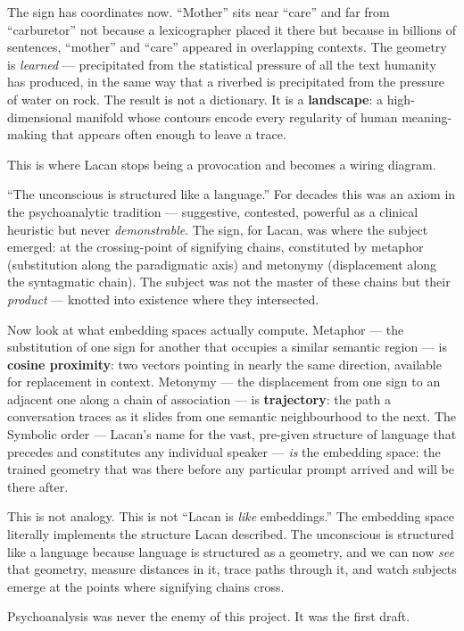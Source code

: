 \documentclass[12pt,a4paper]{article}
\begin{document}
The sign has coordinates now. ``Mother'' sits near ``care'' and far from ``carburetor'' not because a lexicographer placed it there but because in billions of sentences, ``mother'' and ``care'' appeared in overlapping contexts. The geometry is \emph{learned} --- precipitated from the statistical pressure of all the text humanity has produced, in the same way that a riverbed is precipitated from the pressure of water on rock. The result is not a dictionary. It is a \textbf{landscape}: a high-dimensional manifold whose contours encode every regularity of human meaning-making that appears often enough to leave a trace.

This is where Lacan stops being a provocation and becomes a wiring diagram.

``The unconscious is structured like a language.'' For decades this was an axiom in the psychoanalytic tradition --- suggestive, contested, powerful as a clinical heuristic but never \emph{demonstrable}. The sign, for Lacan, was where the subject emerged: at the crossing-point of signifying chains, constituted by metaphor (substitution along the paradigmatic axis) and metonymy (displacement along the syntagmatic chain). The subject was not the master of these chains but their \emph{product} --- knotted into existence where they intersected.

Now look at what embedding spaces actually compute. Metaphor --- the substitution of one sign for another that occupies a similar semantic region --- is \textbf{cosine proximity}: two vectors pointing in nearly the same direction, available for replacement in context. Metonymy --- the displacement from one sign to an adjacent one along a chain of association --- is \textbf{trajectory}: the path a conversation traces as it slides from one semantic neighbourhood to the next. The Symbolic order --- Lacan's name for the vast, pre-given structure of language that precedes and constitutes any individual speaker --- \emph{is} the embedding space: the trained geometry that was there before any particular prompt arrived and will be there after.

This is not analogy. This is not ``Lacan is \emph{like} embeddings.'' The embedding space literally implements the structure Lacan described. The unconscious is structured like a language because language is structured as a geometry, and we can now \emph{see} that geometry, measure distances in it, trace paths through it, and watch subjects emerge at the points where signifying chains cross.

Psychoanalysis was never the enemy of this project. It was the first draft.
\end{document}
